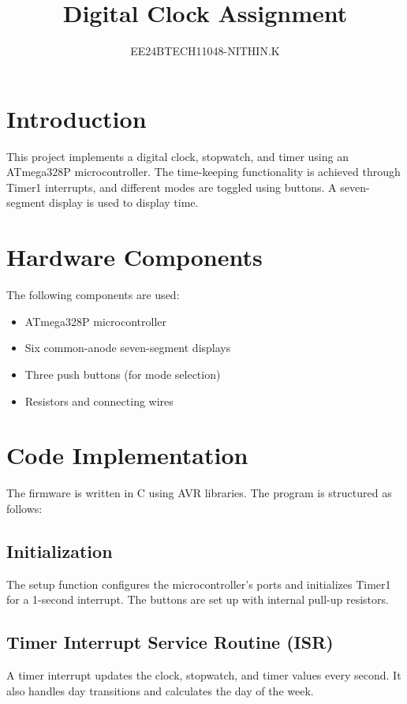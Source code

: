 \documentclass[journal]{IEEEtran}
\numberwithin{equation}{enumi}
\numberwithin{figure}{enumi}
\begin{document}


\title{Digital Clock Assignment}
\author{EE24BTECH11048-NITHIN.K} 
{\let\newpage\relax\maketitle}
\section*{Introduction}
This project implements a digital clock, stopwatch, and timer using an ATmega328P microcontroller. The time-keeping functionality is achieved through Timer1 interrupts, and different modes are toggled using buttons. A seven-segment display is used to display time.

\section*{Hardware Components}
The following components are used:
\begin{itemize}
\item ATmega328P microcontroller
\item Six common-anode seven-segment displays
\item Three push buttons (for mode selection)
\item Resistors and connecting wires
\end{itemize}

\section*{Code Implementation}
The firmware is written in C using AVR libraries. The program is structured as follows:

\subsection{Initialization}
The setup function configures the microcontroller's ports and initializes Timer1 for a 1-second interrupt. The buttons are set up with internal pull-up resistors.

\subsection{Timer Interrupt Service Routine (ISR)}
A timer interrupt updates the clock, stopwatch, and timer values every second. It also handles day transitions and calculates the day of the week.
\end{document}
